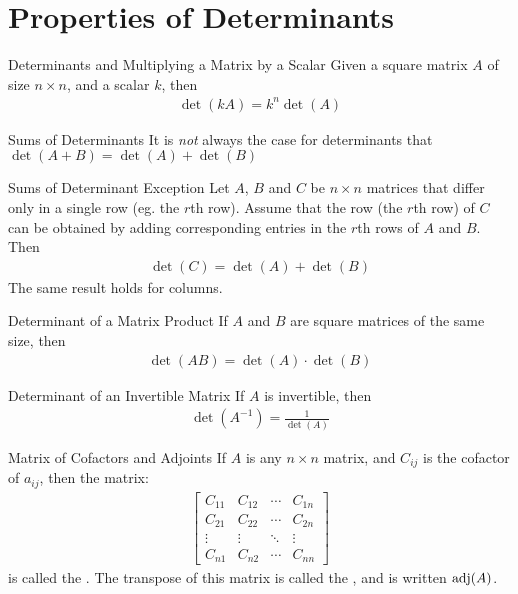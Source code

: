 \documentclass[\main/notes.tex]{subfiles}
\begin{document}
		\section{Properties of Determinants}
			\begin{theorem}{Determinants and Multiplying a Matrix by a Scalar}
				Given a square matrix $A$ of size $n \times n$, and a scalar $k$, then
				\begin{align*}
					\det(kA) = k^{n}\det(A)
				\end{align*}
			\end{theorem}
			\begin{sidenote}{Sums of Determinants}
				It is \emph{not} always the case for determinants that $\det(A + B) = \det(A) + \det(B)$
			\end{sidenote}
			\begin{theorem}{Sums of Determinant Exception}
				Let $A$, $B$ and $C$ be $n \times n$ matrices that differ only in a single row (eg. the $r$th row). Assume that the row (the $r$th row) of $C$ can be obtained by adding corresponding entries in the $r$th rows of $A$ and $B$. Then
				\begin{align*}
					\det(C) = \det(A) + \det(B)
				\end{align*} 
				The same result holds for columns.
			\end{theorem}
			\begin{theorem}{Determinant of a Matrix Product}
				If $A$ and $B$ are square matrices of the same size, then
				\begin{align*}
					\det(AB) = \det(A) \cdot \det(B)
				\end{align*}
			\end{theorem}
			\begin{theorem}{Determinant of an Invertible Matrix}
				If $A$ is invertible, then
				\begin{align*}
					\det(A^{-1}) = \frac{1}{\det(A)}
				\end{align*}
			\end{theorem}
			\begin{definition}{Matrix of Cofactors and Adjoints}
				If $A$ is any $n \times n$ matrix, and $C_{ij}$ is the cofactor of $a_{ij}$, then the matrix:
				\begin{align*}
					\begin{bmatrix}
						C_{11} & C_{12} & \cdots & C_{1n}\\
						C_{21} & C_{22} & \cdots & C_{2n}\\
						\vdots & \vdots & \ddots & \vdots\\
						C_{n1} & C_{n2} & \cdots & C_{nn}
					\end{bmatrix}
				\end{align*}
				is called the . The transpose of this matrix is called the , and is written $\operatorname{adj}(A)$.
			\end{definition}
\end{document}
